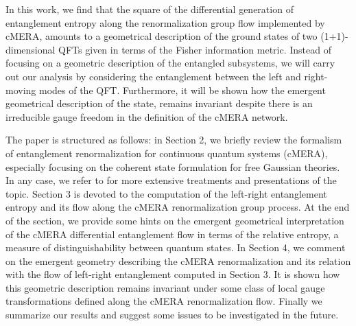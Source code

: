 \documentclass[preprint,aps]{revtex4}
\begin{document}
In this work, we find that the square of the differential generation of entanglement entropy along the renormalization group flow implemented by cMERA, amounts to a geometrical description of the ground states of two (1+1)-dimensional QFTs given in terms of the Fisher information metric. Instead of focusing on a geometric description of the entangled subsystems, we will carry out our analysis by considering the entanglement between the left and right-moving modes of the QFT. Furthermore, it will be shown how the emergent geometrical description of the state, remains invariant despite there is an irreducible gauge freedom in the definition of the cMERA network.

The paper is structured as follows: in Section 2, we briefly review the formalism of entanglement renormalization for continuous quantum systems (cMERA), especially focusing on the coherent state formulation for free Gaussian theories. In any case, we refer to \cite{cMERA, taka1} for more extensive treatments and presentations of the topic. Section 3 is devoted to the computation of the left-right entanglement entropy and its flow along the cMERA renormalization group process. At the end of the section, we provide some hints on the emergent geometrical interpretation of the cMERA differential entanglement flow in terms of the relative entropy, a measure of distinguishability between quantum states. In Section 4, we comment on the emergent geometry describing the cMERA renormalization and its relation with the flow of left-right entanglement computed in Section 3. It is shown how this geometric description remains invariant under some class of local gauge transformations defined along the cMERA renormalization flow. Finally we summarize our results and suggest some issues to be investigated in the future.
 
\end{document}
